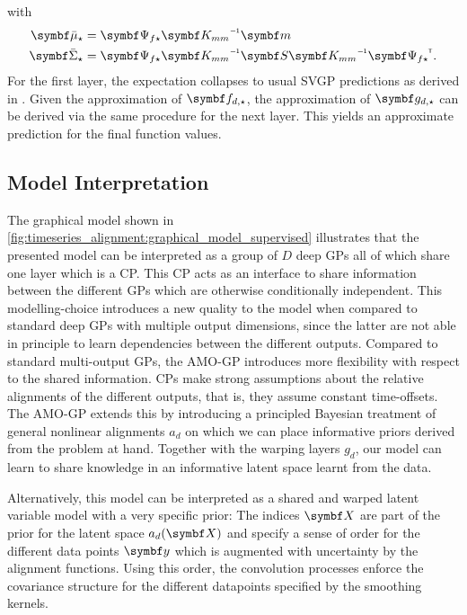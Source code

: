 with 
\begin{align*}
    \mat{\bar{\mu}_{\star}}    & = \mat{\Psi_{f\star}} \mat{K_{mm}}\inv \mat{m}                                        \\
    \mat{\bar{\Sigma}_{\star}} & = \mat{\Psi_{f\star}}\mat{K_{mm}}\inv\mat{S}\mat{K_{mm}}\inv\mat{\Psi_{f\star}}\tran.
\end{align*}
For the first layer, the expectation collapses to usual SVGP predictions as derived in \cite{hensman_scalable_2015}.
Given the approximation of $\rv{f_{d, \star}}$, the approximation of $\rv{g_{d, \star}}$ can be derived via the same procedure for the next layer.
This yields an approximate prediction for the final function values.


\subsection{Model Interpretation}
\label{sub:timeseries_alignment:interpretation}
The graphical model shown in \cref{fig:timeseries_alignment:graphical_model_supervised} illustrates that the presented model can be interpreted as a group of $D$ deep GPs all of which share one layer which is a CP.
This CP acts as an interface to share information between the different GPs which are otherwise conditionally independent.
This modelling-choice introduces a new quality to the model when compared to standard deep GPs with multiple output dimensions, since the latter are not able in principle to learn dependencies between the different outputs.
Compared to standard multi-output GPs, the AMO-GP introduces more flexibility with respect to the shared information.
CPs make strong assumptions about the relative alignments of the different outputs, that is, they assume constant time-offsets.
The AMO-GP extends this by introducing a principled Bayesian treatment of general nonlinear alignments $a_d$ on which we can place informative priors derived from the problem at hand.
Together with the warping layers $g_d$, our model can learn to share knowledge in an informative latent space learnt from the data.

Alternatively, this model can be interpreted as a shared and warped latent variable model with a very specific prior:
The indices $\mat{X}$ are part of the prior for the latent space $a_d(\mat{X})$ and specify a sense of order for the different data points $\mat{y}$ which is augmented with uncertainty by the alignment functions.
Using this order, the convolution processes enforce the covariance structure for the different datapoints specified by the smoothing kernels.

